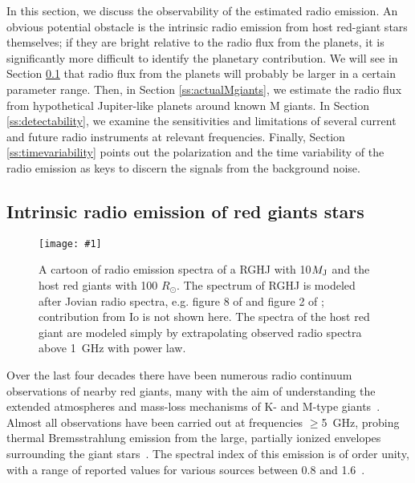 \documentclass[iop,numberedappendix,apj]{emulateapj}
\def\plotonesc#1{\centering \leavevmode
\texttt{[image: \#1]}}
\begin{document}
In this section, we discuss the observability of the estimated radio emission. 
An obvious potential obstacle is the intrinsic radio emission from host red-giant stars themselves; if they are bright relative to the radio flux from the planets, it is significantly more difficult to identify the planetary contribution.
We will see in Section \ref{ss:RGradio} that radio flux from the planets will probably be larger in a certain parameter range. 
Then, in Section \ref{ss:actualMgiants}, we estimate the radio flux from hypothetical Jupiter-like planets around known M giants. 
In Section \ref{ss:detectability}, we examine the sensitivities and limitations of several current and future
radio instruments at relevant frequencies.
Finally, Section \ref{ss:timevariability} points out the polarization and the time variability of the radio emission as keys to discern the signals from the background noise. 


\subsection{Intrinsic radio emission of red giants stars}
\label{ss:RGradio}


\begin{figure*}[tbp]
   \plotonesc{cartoon_10Mj_100pc_smooth.pdf}
   \caption{A cartoon of radio emission spectra of a RGHJ with 10$M_{\rm J}$ and the host red giants with 100 $R_{\odot }$.
The spectrum of RGHJ is modeled after Jovian radio spectra, e.g. figure 8 of \citet{zarka_et_al2004} and figure 2 of \citet{griesmeier2007a}; contribution from Io is not shown here.
The spectra of the host red giant are modeled simply by extrapolating observed radio spectra above 1~GHz with power law. }
  \label{fig:cartoon}
\end{figure*}



Over the last four decades there have been numerous radio continuum observations of nearby red giants, many with the aim of understanding the extended atmospheres and mass-loss mechanisms of K- and M-type giants~\citep[e.g.,][]{Newell1982, Knapp1995, Skinner1997, Lim1998, OGorman2013}.
Almost all observations have been carried out 
at frequencies $\geq$5~GHz, 
probing thermal Bremsstrahlung emission from the large, partially ionized envelopes surrounding the giant stars~\citep{drake1986}.
The spectral index of this emission is of order unity, with a range of reported values for various sources between 0.8 and 1.6~\citep{OGorman2013}.
\end{document}

